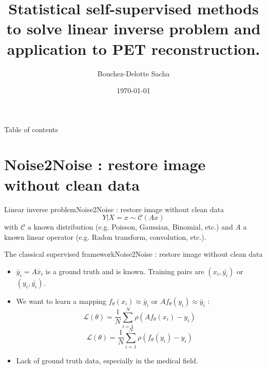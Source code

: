 \documentclass{beamer}
\title[]{Statistical self-supervised methods to solve linear inverse problem and application to PET reconstruction.}
\author{Bouchez-Delotte Sacha}
\date{\today}
\numberwithin{proposition}{section}
\begin{document}
\begin{frame}
    \titlepage
\end{frame}

\begin{frame}{Table of contents}
    \tableofcontents
\end{frame}


\section{Noise2Noise : restore image without clean data}

\begin{frame}{Linear inverse problem}{Noise2Noise : restore image without clean data}
    \begin{equation}
        Y | X=x \sim \mathcal{C}(Ax)
    \end{equation}
    with $\mathcal{C}$ a known distribution (e.g. Poisson, Gaussian, Binomial, etc.) and $A$ a known linear operator (e.g. Radon transform, convolution, etc.).
\end{frame}


\begin{frame}{The classical supervised framework}{Noise2Noise : restore image without clean data}
    
    \begin{itemize}
        \item $\bar{y}_i = A\bar{x}_i$ is a ground truth and is known. Training pairs are $(x_i, \bar{y_i})$ or $(y_i, \bar{y_i})$.
        \item We want to learn a mapping $f_\theta(x_i) \approx \bar{y}_i$ or $Af_\theta(y_i) \approx \bar{y}_i$ :
    \begin{equation}
        \mathcal{L}(\theta) = \frac{1}{N} \sum_{i=1}^N \rho\left(Af_\theta\left(x_i\right) - y_i\right)
        \label{supervised_loss_im}
    \end{equation}
    \begin{equation}
        \mathcal{L}(\theta) = \frac{1}{N} \sum_{i=1}^N \rho\left(f_\theta\left(y_i\right) - y_i\right)
        \label{supervised_loss_data}
    \end{equation}

    \end{itemize}
    \begin{itemize}
        \item Lack of ground truth data, especially in the medical field.
    \end{itemize}

\end{frame}
\end{document}
